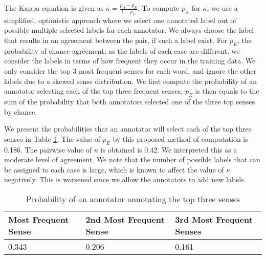 \documentclass[11pt]{article}
\begin{document}
{The Kappa equation is given as 
$\kappa = \frac{p_A - p_E}{1 - p_E} $.
To compute $p_A$ for $\kappa$, we use a simplified, optimistic approach where we select one annotated label out of possibly multiple selected labels for each annotator. We always choose the label that results in an agreement between the pair, if such a label exist. For $p_E$, the probability of chance agreement, as the labels of each case are different, we consider the labels in terms of how frequent they occur in the training data. We only consider the top 3 most frequent senses for each word, and ignore the other labels due to a skewed sense distribution. We first compute the probability of an annotator selecting each of the top three frequent senses, $p_E$ is then equals to the sum of the probability that both annotators selected one of the three top senses by chance. 

We present the probabilities that an annotator will select each of the top three senses in Table \ref{table:IAA}. The value of $p_E$ by this proposed method of computation is 0.186. The pairwise value of $\kappa$ is obtained is 0.42. We interpreted this as a moderate level of agreement. We note that the number of possible labels that can be assigned to each case is large, which is known to affect the value of $\kappa$ negatively. This is worsened since we allow the annotators to add new labels. 

\begin{table}[ht]
	\caption{Probability of an annotator annotating the top three senses}
	\label{table:IAA}
	\begin{center}
		\begin{tabular}{| p{4cm} | p{4cm}  | p{4cm} | }
			\hline
			Most Frequent Sense & 2nd Most Frequent Sense & 3rd Most Frequent Senses\\
			\hline
			0.343 & 0.206 & 0.161\\						
			
			\hline
		\end{tabular}
	\end{center}
\end{table}

}
\end{document}
